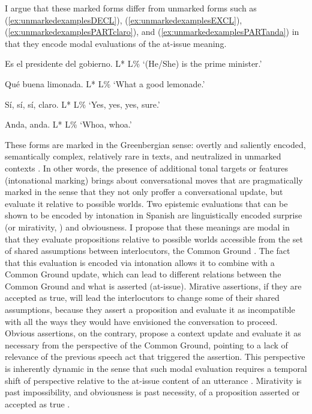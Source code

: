 I argue that these marked forms differ from unmarked forms such as (\ref{ex:unmarkedexamplesDECL}), (\ref{ex:unmarkedexamplesEXCL}), (\ref{ex:unmarkedexamplesPARTclaro}), and (\ref{ex:unmarkedexamplesPARTanda}) in that they encode modal evaluations of the at-issue meaning.

\begin{exe}
\ex \label{ex:unmarkedexamplesDECL} Es el presidente del gobierno. L* L\% \href{https://osf.io/jbuv4/}{\faVolumeUp}
\glt `(He/She) is the prime minister.' 

\ex \label{ex:unmarkedexamplesEXCL} Qué buena limonada. L* L\% \href{https://osf.io/97bys/}{\faVolumeUp}
\glt `What a good lemonade.' 

\ex \label{ex:unmarkedexamplesPARTclaro} Sí, sí, sí, claro. L* L\% \href{https://osf.io/627hp/}{\faVolumeUp}
\glt `Yes, yes, yes, sure.' 

\ex \label{ex:unmarkedexamplesPARTanda} Anda, anda. L* L\%  \href{https://osf.io/cjbev/}{\faVolumeUp}
\glt `Whoa, whoa.' 
\end{exe}

These forms are marked in the Greenbergian sense: overtly and saliently encoded, semantically complex, relatively rare in texts, and neutralized in un\-mar\-ked contexts \citep{Haspelmath.2006againstmarkedness,Greenberg.1966}. In other words, the presence of additional tonal targets or features (intonational marking) brings about conversational moves that are pragmatically marked in the sense that they not only proffer a conversational update, but evaluate it relative to possible worlds. Two epistemic evaluations that can be shown to be encoded by intonation in Spanish are linguistically encoded surprise (or mirativity, \citealt{DeLancey.1997,DeLancey.2012,RettSturman.2020,Rett.2011,HengeveldOlbertz.2012}) and obviousness. I propose that these meanings are modal in that they evaluate propositions relative to possible worlds accessible from the set of shared assumptions between interlocutors, the Common Ground \citep{Stalnaker.1974}. The fact that this evaluation is encoded via intonation allows it to combine with a Common Ground update, which can lead to different relations between the Common Ground and what is asserted (at-issue). Mirative assertions, if they are accepted as true, will lead the interlocutors to change some of their shared assumptions, because they assert a proposition and evaluate it as incompatible with all the ways they would have envisioned the conversation to proceed. Obvious assertions, on the contrary, propose a context update and evaluate it as necessary from the perspective of the Common Ground, pointing to a lack of relevance of the previous speech act that triggered the assertion. This perspective is inherently dynamic in the sense that such modal evaluation requires a temporal shift of perspective relative to the at-issue content of an utterance \citep{FilippiDeswelle.2019}. Mirativity is past impossibility, and obviousness is past necessity, of a proposition asserted or accepted as true \citep{Reich.2018}.

